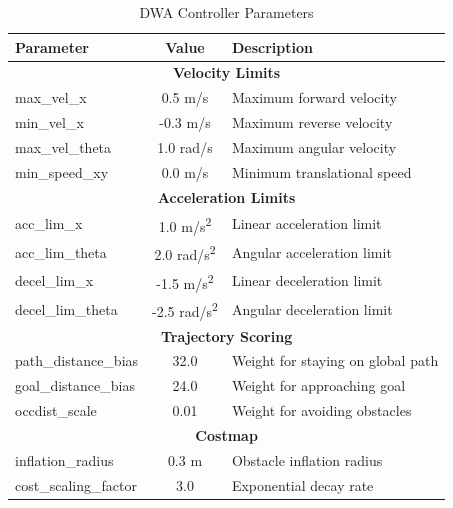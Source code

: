\documentclass[11pt,letterpaper]{article}
\begin{document}
\begin{table}[H]
\centering
\caption{DWA Controller Parameters}
\begin{tabular}{|l|c|l|}
\hline
\textbf{Parameter} & \textbf{Value} & \textbf{Description} \\
\hline
\multicolumn{3}{|c|}{\textbf{Velocity Limits}} \\
\hline
max\_vel\_x & 0.5 m/s & Maximum forward velocity \\
\hline
min\_vel\_x & -0.3 m/s & Maximum reverse velocity \\
\hline
max\_vel\_theta & 1.0 rad/s & Maximum angular velocity \\
\hline
min\_speed\_xy & 0.0 m/s & Minimum translational speed \\
\hline
\multicolumn{3}{|c|}{\textbf{Acceleration Limits}} \\
\hline
acc\_lim\_x & 1.0 m/s\textsuperscript{2} & Linear acceleration limit \\
\hline
acc\_lim\_theta & 2.0 rad/s\textsuperscript{2} & Angular acceleration limit \\
\hline
decel\_lim\_x & -1.5 m/s\textsuperscript{2} & Linear deceleration limit \\
\hline
decel\_lim\_theta & -2.5 rad/s\textsuperscript{2} & Angular deceleration limit \\
\hline
\multicolumn{3}{|c|}{\textbf{Trajectory Scoring}} \\
\hline
path\_distance\_bias & 32.0 & Weight for staying on global path \\
\hline
goal\_distance\_bias & 24.0 & Weight for approaching goal \\
\hline
occdist\_scale & 0.01 & Weight for avoiding obstacles \\
\hline
\multicolumn{3}{|c|}{\textbf{Costmap}} \\
\hline
inflation\_radius & 0.3 m & Obstacle inflation radius \\
\hline
cost\_scaling\_factor & 3.0 & Exponential decay rate \\
\hline
\end{tabular}
\end{table}
\end{document}
